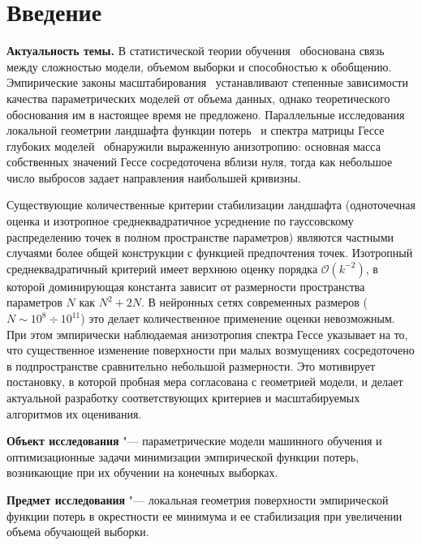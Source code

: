 \cleardoublepage
{}
{}
\section*{Введение}

\textbf{Актуальность темы.} В статистической теории обучения~\cite{vapnik1998statistical,shalev2014understanding} обоснована связь между сложностью модели, объемом выборки и способностью к обобщению. Эмпирические законы масштабирования~\cite{kaplan2020scaling,hoffmann2022chinchila} устанавливают степенные зависимости качества параметрических моделей от объема данных, однако теоретического обоснования им в настоящее время не предложено. Параллельные исследования локальной геометрии ландшафта функции потерь~\cite{li2018visualizing,draxler2018essentially} и спектра матрицы Гессе глубоких моделей~\cite{sagun2017hessian,ghorbani2019investigation,papyan2020traces} обнаружили выраженную анизотропию: основная масса собственных значений Гессе сосредоточена вблизи нуля, тогда как небольшое число выбросов задает направления наибольшей кривизны.

Существующие количественные критерии стабилизации ландшафта (одноточечная оценка и изотропное среднеквадратичное усреднение по гауссовскому распределению точек в полном пространстве параметров) являются частными случаями более общей конструкции с функцией предпочтения точек. Изотропный среднеквадратичный критерий имеет верхнюю оценку порядка $\mathcal O(k^{-2})$, в которой доминирующая константа зависит от размерности пространства параметров $N$ как $N^2+2N$. В нейронных сетях современных размеров ($N\sim 10^{8} \div 10^{11}$) это делает количественное применение оценки невозможным. При этом эмпирически наблюдаемая анизотропия спектра Гессе указывает на то, что существенное изменение поверхности при малых возмущениях сосредоточено в подпространстве сравнительно небольшой размерности. Это мотивирует постановку, в которой пробная мера согласована с геометрией модели, и делает актуальной разработку соответствующих критериев и масштабируемых алгоритмов их оценивания.

\textbf{Объект исследования} "--- параметрические модели машинного обучения и оптимизационные задачи минимизации эмпирической функции потерь, возникающие при их обучении на конечных выборках.

\textbf{Предмет исследования} "--- локальная геометрия поверхности эмпирической функции потерь в окрестности ее минимума и ее стабилизация при увеличении объема обучающей выборки.

